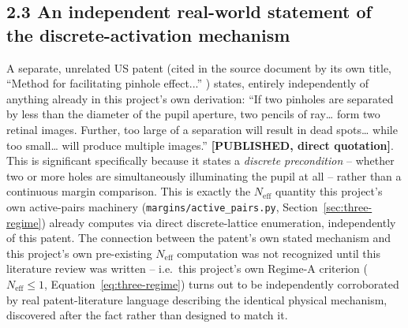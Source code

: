 \subsection{2.3 An independent real-world statement of the discrete-activation mechanism}
A separate, unrelated US patent (cited in the source document by its own title,
``Method for facilitating pinhole effect...''
) states,
entirely independently of anything already in this project's own derivation: ``If two
pinholes are separated by less than the diameter of the pupil aperture, two pencils of
ray\ldots{} form two retinal images. Further, too large of a separation will result in
dead spots\ldots{} while too small\ldots{} will produce multiple images.''
\textbf{[PUBLISHED, direct quotation]}. This is significant specifically because it
states a \emph{discrete precondition} -- whether two or more holes are simultaneously
illuminating the pupil at all -- rather than a continuous margin comparison. This is
exactly the $N_{\mathrm{eff}}$ quantity this project's own active-pairs machinery
(\texttt{margins/active\_pairs.py}, Section~\ref{sec:three-regime}) already computes
via direct discrete-lattice enumeration, independently of this patent. The connection
between the patent's own stated mechanism and this project's own pre-existing
$N_{\mathrm{eff}}$ computation was not recognized until this literature review was
written -- i.e.\ this project's own Regime-A criterion ($N_{\mathrm{eff}}\le1$,
Equation~\ref{eq:three-regime}) turns out to be independently corroborated by real
patent-literature language describing the identical physical mechanism, discovered
after the fact rather than designed to match it.

